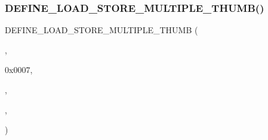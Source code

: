 \subsubsection{\texorpdfstring{D\+E\+F\+I\+N\+E\+\_\+\+L\+O\+A\+D\+\_\+\+S\+T\+O\+R\+E\+\_\+\+M\+U\+L\+T\+I\+P\+L\+E\+\_\+\+T\+H\+U\+M\+B()}{DEFINE\_LOAD\_STORE\_MULTIPLE\_THUMB()}\hspace{0.1cm}{\footnotesize\ttfamily [1/3]}}
{\footnotesize\ttfamily D\+E\+F\+I\+N\+E\+\_\+\+L\+O\+A\+D\+\_\+\+S\+T\+O\+R\+E\+\_\+\+M\+U\+L\+T\+I\+P\+L\+E\+\_\+\+T\+H\+U\+MB (\begin{DoxyParamCaption}\item[{L\+D\+M\+IA}]{,  }\item[{(opcode $>$$>$ 8) \&}]{0x0007,  }\item[{\mbox{\hyperlink{pufftest_8c_a6e4d4615cece3375ac8c7b94a1ade4fa}{load}}}]{,  }\item[{\mbox{\hyperlink{isa-thumb_8c_a3048b70ae3e6d982e60f063bd78fda51}{IA}}}]{,  }\item[{\mbox{\hyperlink{isa-thumb_8c_a9438645a9cdcda0203c3769a4658e9b1}{T\+H\+U\+M\+B\+\_\+\+L\+O\+A\+D\+\_\+\+P\+O\+S\+T\+\_\+\+B\+O\+DY}};\mbox{\hyperlink{isa-lr35902_8c_a2eb27369cb3dbac14564f95cd51effdf}{if}}(!((1$<$$<$ rn) \&\mbox{\hyperlink{isa-thumb_8c_a03b78d51ad860bbea2f9c98276d0b70b}{rs}})) \{ cpu-\/$>$\mbox{\hyperlink{isa-thumb_8c_a6b4b7e13a9a144391615b217c5917bc7}{gprs}}\mbox{[}rn\mbox{]}=address;\}}]{ }\end{DoxyParamCaption})}

\mbox{\label{isa-thumb_8c_ae45d955a12de72fb092edf7f0d87124f}} 
